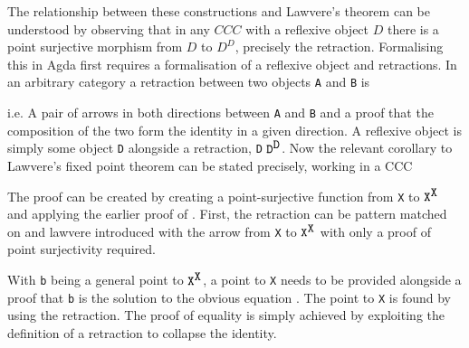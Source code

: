 The relationship between these constructions and Lawvere's theorem can be
understood by observing that in any $CCC$ with a reflexive object $D$ there is a
point surjective morphism from $D$ to $D^D$, precisely the retraction.
Formalising this in Agda first requires a formalisation of a reflexive object
and retractions. In an arbitrary category a retraction between two objects
\verb|A| and \verb|B| is


i.e. A pair of arrows in both directions between \verb|A| and \verb|B| and a
proof that the composition of the two form the identity in a given direction.
A reflexive object is simply some object \verb|D| alongside a retraction,
 \verb|D| $\verb|D|^{\verb|D|}$. Now the relevant
corollary to Lawvere's fixed point theorem can be stated precisely, working in a
CCC


The proof can be created by creating a point-surjective function from \verb|X|
to $\verb|X|^{\verb|X|}$ and applying the earlier proof of
. First, the retraction can be pattern matched on and
lawvere introduced with the arrow from \verb|X| to $\verb|X|^{\verb|X|}$ with
only a proof of point surjectivity required.


With \verb|b| being a general point to $\verb|X|^{\verb|X|}$, a point to
\verb|X| needs to be provided alongside a proof that \verb|b| is the solution to
the obvious equation . The point to \verb|X| is found by
using the retraction. The proof of equality is simply achieved by exploiting the
definition of a retraction to collapse the identity.



